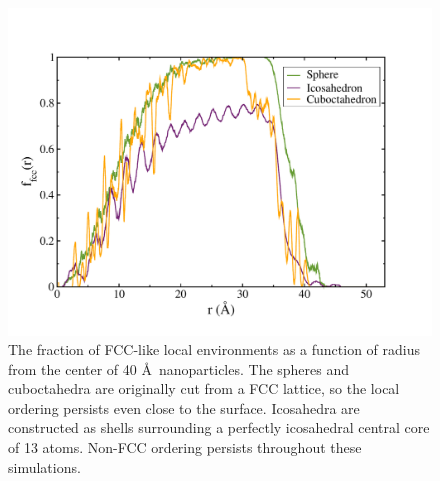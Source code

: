 \begin{figure}[!htb]
        \includegraphics[width=5in]{figures/struct-bowr.pdf}
        \caption{The fraction of FCC-like local environments as a
          function of radius from the center of 40 \AA\ nanoparticles.
          The spheres and cuboctahedra are originally cut from a FCC
          lattice, so the local ordering persists even close to the
          surface.  Icosahedra are constructed as shells surrounding a
          perfectly icosahedral central core of 13 atoms. Non-FCC
          ordering persists throughout these simulations.}
        \label{fig:struct-bowr}
 \end{figure}


